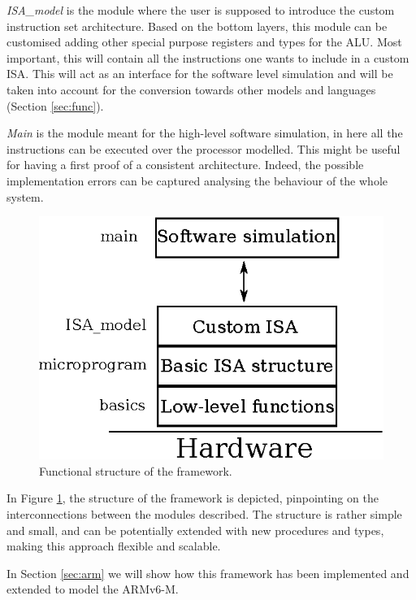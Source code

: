 \documentclass[conference]{IEEEtran}
\begin{document}
\textit{ISA\_model} is the module where the user is supposed to introduce the custom 
instruction set architecture. Based on the bottom layers, this
module can be customised adding other special purpose registers and types for the ALU.
Most important, this will contain all the instructions one wants to include in a custom ISA. This will act as an interface for the software level simulation and will be taken into
account for the conversion towards other models and languages (Section \ref{sec:func}).

\textit{Main} is the module meant for the high-level software simulation, in here
all the instructions can be executed over the processor modelled. This might be useful
for having a first proof of a consistent architecture. Indeed, the possible implementation
errors can be captured analysing the behaviour of the whole system.

\begin{figure}[ht!]
\begin{center}
	\includegraphics[scale=1]{IMG/structure.eps}
	\caption{Functional structure of the framework.}
	\label{fig:structure}
\end{center}
\end{figure}

In Figure \ref{fig:structure}, the structure of the framework is depicted, pinpointing 
on the interconnections between the modules described. The structure is rather simple
and small, and can be potentially extended with new procedures and types, making
this approach flexible and scalable.

In Section \ref{sec:arm} we will show how this framework has been implemented and extended
to model the ARMv6-M.
\end{document}
